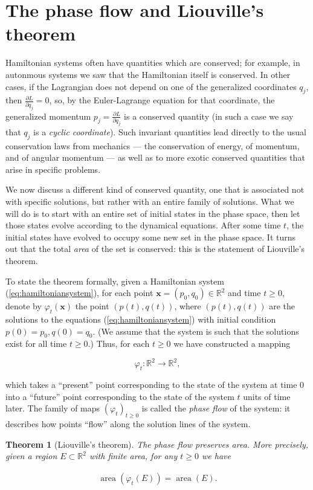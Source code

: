 \documentclass[11pt]{report}
\theoremstyle{plain}
\newtheorem{thm}{Theorem}[chapter]
\theoremstyle{definition}
\begin{document}
\section{The phase flow and Liouville's theorem}
Hamiltonian systems often have quantities which are
conserved; for example, in autonmous systems we saw
that the Hamiltonian itself is conserved. In other
cases, if the Lagrangian does not depend on one of the
generalized coordinates $q_j$, then
$\frac{\partial L}{\partial q_j}=0$, so, by the
Euler-Lagrange equation for that coordinate, the
generalized momentum
$p_j = \frac{\partial L}{\partial \dot{q}_j}$ is a
conserved quantity (in such a case we say that $q_j$
is a \emph{cyclic coordinate}). Such invariant quantities
lead directly to the usual conservation laws from
mechanics --- the conservation of energy, of momentum,
and of angular momentum --- as well as to more exotic
conserved quantities that arise in specific problems.

We now discuss a different kind of conserved
quantity, one that is associated not with specific
solutions, but rather with an entire family of
solutions. What we will do is to start with an entire
set of initial states in the phase space, then let
those states evolve according to the dynamical
equations. After some time $t$, the initial states
have evolved to occupy some new set in the phase
space. It turns out that the total \emph{area} of the set
is conserved: this is the statement of Liouville's
theorem.

To state the theorem formally, given a Hamiltonian
system (\ref{eq:hamiltoniansystem}), for each point
$\mathbf{x}=(p_0,q_0)\in\mathbb{R}^2$ and time
$t\ge 0$, denote by $\varphi_t(\mathbf{x})$ the point
$(p(t),q(t))$, where $(p(t),q(t))$ are the solutions
to the equations (\ref{eq:hamiltoniansystem}) with initial
condition $p(0)=p_0, q(0)=q_0$. (We assume that the
system is such that the solutions exist for all time
$t\ge 0$.) Thus, for each $t\ge 0$ we have
constructed a mapping

\[
\varphi_t:\mathbb{R}^2\to\mathbb{R}^2,
\]

which takes a ``present'' point corresponding to the
state of the system at time $0$ into a ``future''
point corresponding to the state of the system $t$
units of time later. The family of maps
$(\varphi_t)_{t\ge 0}$ is called the \emph{phase flow} of
the system: it describes how points ``flow'' along the
solution lines of the system.

\begin{thm}[Liouville's theorem]
The phase flow preserves area. More precisely, given
a region $E\subset\mathbb{R}^2$ with finite area, for
any $t\ge 0$ we have

\begin{align*}
\operatorname{area}(\varphi_t(E)) = \operatorname{area}(E).
\end{align*}

\end{thm}
\end{document}
